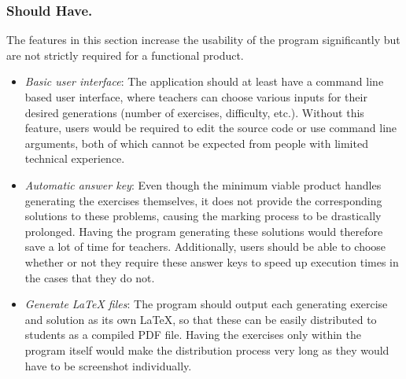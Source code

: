 \documentclass{l4proj}
\begin{document}
\subsubsection{Should Have.}
The features in this section increase the usability of the program significantly but are not strictly required for a functional product.
\begin{itemize}
	\item
	\emph{Basic user interface}: The application should at least have a command line based user interface, where teachers can choose various inputs for their desired generations (number of exercises, difficulty, etc.). Without this feature, users would be required to edit the source code or use command line arguments, both of which cannot be expected from people with limited technical experience. 
	\item
	\emph{Automatic answer key}: Even though the minimum viable product handles generating the exercises themselves,  it does not provide the corresponding solutions to these problems, causing the marking process to be drastically prolonged. Having the program generating these solutions would therefore save a lot of time for teachers. Additionally, users should be able to choose whether or not they require these answer keys to speed up execution times in the cases that they do not.
	\item
	\emph{Generate LaTeX files}: The program should output each generating exercise and solution as its own LaTeX, so that these can be easily distributed to students as a compiled PDF file. Having the exercises only within the program itself would make the distribution process very long as they would have to be screenshot individually.
\end{itemize}
\end{document}
